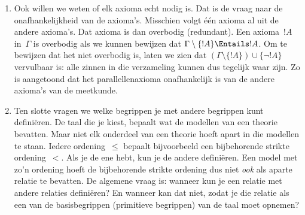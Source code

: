 \documentclass[../../../include/open-logic-section]{subfiles}
\begin{document}
\begin{explain}
\begin{enumerate}
  van~$\Gamma$ te vinden. Als de theorie modellen heeft, kunnen we die
  met logische methoden onderzoeken en ook nieuwe modellen bouwen.
\item Ook willen we weten of elk axioma echt nodig is. Dat is de vraag
  naar de onafhankelijkheid van de axioma's. Misschien volgt één
  axioma al uit de andere axioma's. Dat axioma is dan overbodig
  (redundant). Een axioma~$!A$ in~$\Gamma$ is overbodig als we kunnen
  bewijzen dat $\Gamma \setminus \{!A\} \Entails !A$. Om te bewijzen
  dat het niet overbodig is, laten we zien dat
  $(\Gamma \setminus \{!A\}) \cup \{\lnot !A\}$ vervulbaar is: alle
  zinnen in die verzameling kunnen dus tegelijk waar zijn. Zo is
  aangetoond dat het parallellenaxioma onafhankelijk is van de andere
  axioma's van de meetkunde.
\item Ten slotte vragen we welke begrippen je met andere begrippen kunt
  definiëren. De taal die je kiest, bepaalt wat de modellen van een
  theorie bevatten. Maar niet elk onderdeel van een theorie hoeft
  apart in die modellen te staan. Iedere ordening~$\le$ bepaalt
  bijvoorbeeld een bijbehorende strikte ordening~$<$. Als je de ene
  hebt, kun je de andere definiëren. Een model met zo'n ordening hoeft
  de bijbehorende strikte ordening dus niet \emph{ook} als aparte
  relatie te bevatten. De algemene vraag is: wanneer kun je een
  relatie met andere relaties definiëren? En wanneer kan dat niet,
  zodat je die relatie als een van de basisbegrippen (primitieve
  begrippen) van de taal moet opnemen?
\end{enumerate}
\end{explain}
\end{document}
